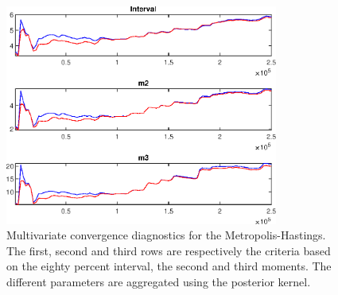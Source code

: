  
\begin{figure}[H]
\centering 
\includegraphics[width=0.8\textwidth]{BRS_imp_mobility/Output/BRS_imp_mobility_mdiag}
\caption{Multivariate convergence diagnostics for the Metropolis-Hastings.
The first, second and third rows are respectively the criteria based on
the eighty percent interval, the second and third moments. The different 
parameters are aggregated using the posterior kernel.}\label{Fig:MultivariateDiagnostics}
\end{figure}

